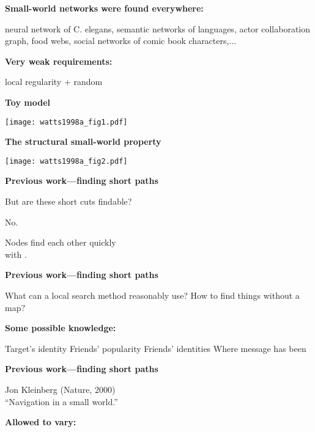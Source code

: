   \textbf{Small-world networks were found everywhere:}
    
     neural network of C. elegans,
     semantic networks of languages,
     actor collaboration graph,
     food webs,
     social networks of comic book characters,...
    
  

  \textbf{Very weak requirements:}
    
     \alert{local regularity}
      {+ random }
    
  

  

  \textbf{Toy model}

    \texttt{[image: watts1998a\_fig1.pdf]}


  \textbf{The structural small-world property}

    \texttt{[image: watts1998a\_fig2.pdf]}




  \textbf{Previous work---finding short paths}


  But are these short cuts findable?

  \bigskip

  {\alert{No.}}

  \bigskip

  {
  Nodes  find each other quickly\\ 
  with .
  }



  \textbf{Previous work---finding short paths}

  
   What can a local search method reasonably use?
    How to find things without a map?
  
  
  \bigskip

  \textbf{Some possible knowledge:}
    
     Target's identity
     Friends' popularity 
     Friends' identities 
     Where message has been 
    
  


  \textbf{Previous work---finding short paths}

  Jon Kleinberg (Nature, 2000)\cite{kleinberg2000a}\\
   ``Navigation in a small world.''

   \bigskip
   
   \textbf{Allowed to vary:}
     
